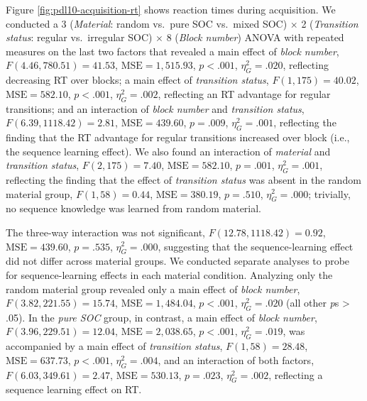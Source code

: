 \documentclass[man]{apa6}
\theoremstyle{definition}
\theoremstyle{definition}
\theoremstyle{definition}
\theoremstyle{remark}
\begin{document}
Figure \ref{fig:pdl10-acquisition-rt} shows reaction times during
acquisition. We conducted a 3 (\emph{Material}: random vs.~pure SOC
vs.~mixed SOC) \(\times\) 2 (\emph{Transition status}: regular
vs.~irregular SOC) \(\times\) 8 (\emph{Block number}) ANOVA with
repeated measures on the last two factors that revealed a main effect of
\emph{block number}, \(F(4.46, 780.51) = 41.53\),
\(\mathrm{MSE} = 1,515.93\), \(p < .001\), \(\eta^2_G = .020\),
reflecting decreasing RT over blocks; a main effect of \emph{transition
status}, \(F(1, 175) = 40.02\), \(\mathrm{MSE} = 582.10\), \(p < .001\),
\(\eta^2_G = .002\), reflecting an RT advantage for regular transitions;
and an interaction of \emph{block number} and \emph{transition status},
\(F(6.39, 1118.42) = 2.81\), \(\mathrm{MSE} = 439.60\), \(p = .009\),
\(\eta^2_G = .001\), reflecting the finding that the RT advantage for
regular transitions increased over block (i.e., the sequence learning
effect). We also found an interaction of \emph{material} and
\emph{transition status}, \(F(2, 175) = 7.40\),
\(\mathrm{MSE} = 582.10\), \(p = .001\), \(\eta^2_G = .001\), reflecting
the finding that the effect of \emph{transition status} was absent in
the random material group, \(F(1, 58) = 0.44\),
\(\mathrm{MSE} = 380.19\), \(p = .510\), \(\eta^2_G = .000\); trivially,
no sequence knowledge was learned from random material.

The three-way interaction was not significant,
\(F(12.78, 1118.42) = 0.92\), \(\mathrm{MSE} = 439.60\), \(p = .535\),
\(\eta^2_G = .000\), suggesting that the sequence-learning effect did
not differ across material groups. We conducted separate analyses to
probe for sequence-learning effects in each material condition.
Analyzing only the random material group revealed only a main effect of
\emph{block number}, \(F(3.82, 221.55) = 15.74\),
\(\mathrm{MSE} = 1,484.04\), \(p < .001\), \(\eta^2_G = .020\) (all
other \emph{p}s \textgreater{} .05). In the \emph{pure SOC} group, in
contrast, a main effect of \emph{block number},
\(F(3.96, 229.51) = 12.04\), \(\mathrm{MSE} = 2,038.65\), \(p < .001\),
\(\eta^2_G = .019\), was accompanied by a main effect of
\emph{transition status}, \(F(1, 58) = 28.48\),
\(\mathrm{MSE} = 637.73\), \(p < .001\), \(\eta^2_G = .004\), and an
interaction of both factors, \(F(6.03, 349.61) = 2.47\),
\(\mathrm{MSE} = 530.13\), \(p = .023\), \(\eta^2_G = .002\), reflecting
a sequence learning effect on RT.
\end{document}
